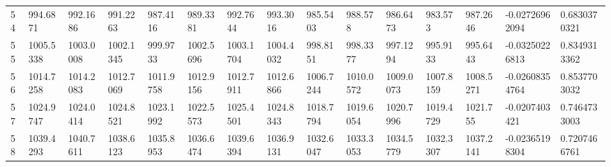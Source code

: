 \begin{landscape}
{\begin{longtable}{@{}lllllllllllllll@{}}
		54                                           & 994.6871                 & 992.1686                 & 991.2263                 & 987.4116                 & 989.3381                 & 992.7644                 & 993.3016                 & 985.5403                 & 988.578                  & 986.6473                 & 983.573                  & 987.2646                 & -0.02726962094                                                         & 0.6830370321                                    \\
		55                                           & 1005.5338                & 1003.0008                & 1002.1345                & 999.9733                 & 1002.5696                & 1003.1704                & 1004.4032                & 998.8151                 & 998.3377                 & 997.1294                 & 995.9133                 & 995.6443                 & -0.03250226813                                                         & 0.8349313362                                    \\
		56                                           & 1014.7258                & 1014.2083                & 1012.7069                & 1011.9758                & 1012.9156                & 1012.7911                & 1012.6866                & 1006.7244                & 1010.0572                & 1009.0073                & 1007.8159                & 1008.5271                & -0.02608354764                                                         & 0.8537703032                                    \\
		57                                           & 1024.9747                & 1024.0414                & 1024.8521                & 1023.1992                & 1022.5573                & 1025.4501                & 1024.8343                & 1018.7794                & 1019.6054                & 1020.7996                & 1019.4729                & 1021.755                 & -0.0207403421                                                          & 0.7464733003                                    \\
		58                                           & 1039.4293                & 1040.7611                & 1038.6123                & 1035.8953                & 1036.6474                & 1039.6394                & 1036.9131                & 1032.6047                & 1033.3053                & 1034.5779                & 1032.3307                & 1037.2141                & -0.02365198304                                                         & 0.7207466761                                    \\

\end{longtable}}
\end{landscape}
